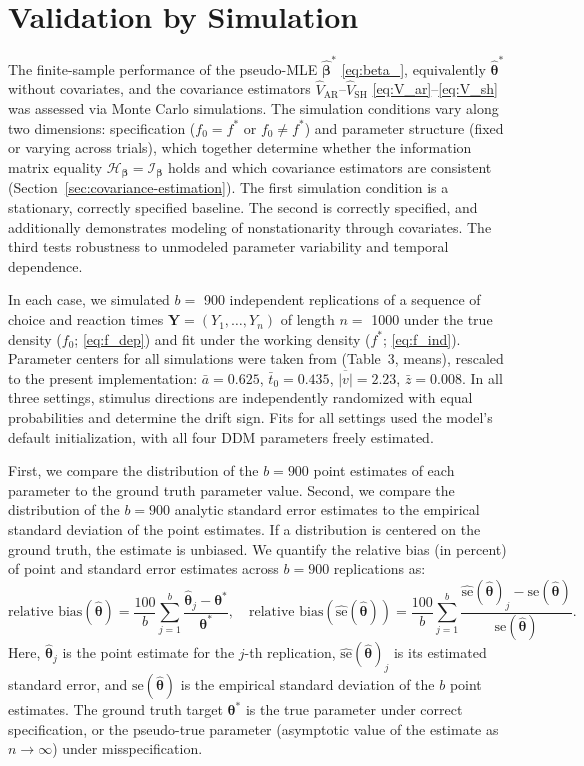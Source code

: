 \documentclass[00-main.tex]{subfiles}
\begin{document}
\section{Validation by Simulation}\label{sec:simulations}
The finite-sample performance of the pseudo-MLE $\hat{\bm\beta}^*$ \eqref{eq:beta_}, equivalently $\hat{\bm\theta}^*$ without covariates, and the covariance estimators $\widehat{V}_\text{AR}$--$\widehat{V}_\text{SH}$ \eqref{eq:V_ar}--\eqref{eq:V_sh} was assessed via Monte Carlo simulations. The simulation conditions vary along two dimensions: specification ($f_0 = f^*$ or $f_0 \neq f^*$) and parameter structure (fixed or varying across trials), which together determine whether the information matrix equality $\mathcal{H}_{\bm\beta} = \mathscr{I}_{\bm\beta}$ holds and which covariance estimators are consistent (Section~\ref{sec:covariance-estimation}). The first simulation condition is a stationary, correctly specified baseline. The second is correctly specified, and additionally demonstrates modeling of nonstationarity through covariates. The third tests robustness to unmodeled parameter variability and temporal dependence.

In each case, we simulated $b =$ 900 independent replications of a sequence of choice and reaction times $\bm{Y} = (Y_1, \dots, Y_n)$ of length $n =$ 1000 under the true density ($f_0$; \ref{eq:f_dep}) and fit under the working density ($f^*$; \ref{eq:f_ind}). Parameter centers for all simulations were taken from \citet{matzke_psychological_2009} (Table~3, means), rescaled to the present implementation: $\bar{a} = 0.625$, $\bar{t}_0 = 0.435$, $\overline{|v|} = 2.23$, $\bar{z} = 0.008$. In all three settings, stimulus directions are independently randomized with equal probabilities and determine the drift sign. Fits for all settings used the model's default initialization, with all four DDM parameters freely estimated.

First, we compare the distribution of the $b=900$ point estimates of each parameter to the ground truth parameter value. Second, we compare the distribution of the $b=900$ analytic standard error estimates to the empirical standard deviation of the point estimates.  If a distribution is centered on the ground truth, the estimate is unbiased. We quantify the relative bias (in percent) of point and standard error estimates across $b=900$ replications as:
\begin{equation}
    \text{relative bias}(\hat{\bm\theta}) = \frac{100}{b} \sum_{j=1}^b \frac{\hat{\bm\theta}_j - \bm\theta^*}{\bm\theta^*}, \quad
    \text{relative bias}(\widehat{\text{se}}(\hat{\bm\theta})) = \frac{100}{b} \sum_{j=1}^b \frac{\widehat{\text{se}}(\hat{\bm\theta})_j - \text{se}(\hat{\bm\theta})}{\text{se}(\hat{\bm\theta})}. \label{eq:rb}
\end{equation}
Here, $\hat{\bm\theta}_j$ is the point estimate for the $j$-th replication, $\widehat{\text{se}}(\hat{\bm\theta})_j$ is its estimated standard error, and $\text{se}(\hat{\bm\theta})$ is the empirical standard deviation of the $b$ point estimates. The ground truth target $\bm\theta^*$ is the true parameter under correct specification, or the pseudo-true parameter (asymptotic value of the estimate as $n \to \infty$) under misspecification.
\end{document}
